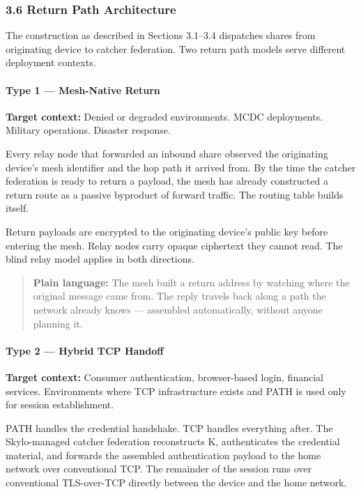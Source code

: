 \documentclass[
  11pt,
]{article}
\begin{document}
\hypertarget{return-path-architecture}{%
\subsubsection{3.6 Return Path
Architecture}\label{return-path-architecture}}

The construction as described in Sections 3.1--3.4 dispatches shares
from originating device to catcher federation. Two return path models
serve different deployment contexts.

\hypertarget{type-1-mesh-native-return}{%
\paragraph{Type 1 --- Mesh-Native
Return}\label{type-1-mesh-native-return}}

\textbf{Target context:} Denied or degraded environments. MCDC
deployments. Military operations. Disaster response.

Every relay node that forwarded an inbound share observed the
originating device's mesh identifier and the hop path it arrived from.
By the time the catcher federation is ready to return a payload, the
mesh has already constructed a return route as a passive byproduct of
forward traffic. The routing table builds itself.

Return payloads are encrypted to the originating device's public key
before entering the mesh. Relay nodes carry opaque ciphertext they
cannot read. The blind relay model applies in both directions.

\begin{quote}
\textbf{Plain language:} The mesh built a return address by watching
where the original message came from. The reply travels back along a
path the network already knows --- assembled automatically, without
anyone planning it.
\end{quote}

\hypertarget{type-2-hybrid-tcp-handoff}{%
\paragraph{Type 2 --- Hybrid TCP
Handoff}\label{type-2-hybrid-tcp-handoff}}

\textbf{Target context:} Consumer authentication, browser-based login,
financial services. Environments where TCP infrastructure exists and
PATH is used only for session establishment.

PATH handles the credential handshake. TCP handles everything after. The
Skylo-managed catcher federation reconstructs K, authenticates the
credential material, and forwards the assembled authentication payload
to the home network over conventional TCP. The remainder of the session
runs over conventional TLS-over-TCP directly between the device and the
home network.
\end{document}
